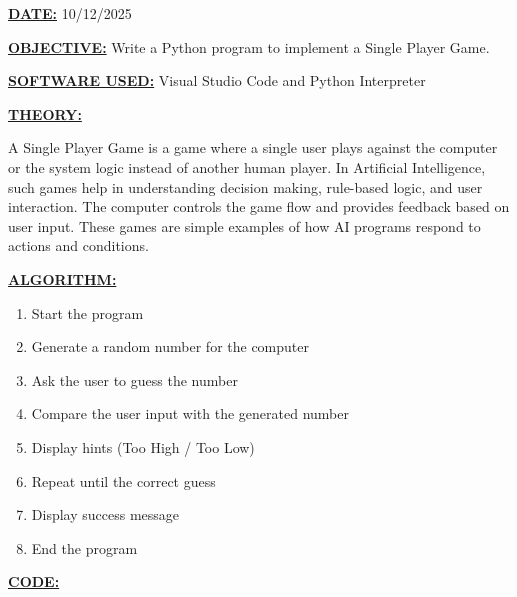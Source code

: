 \documentclass[12pt,a4paper]{article}
\begin{document}
\textbf{\underline{DATE:}} 10/12/2025

\vspace{0.5cm}
\textbf{\underline{OBJECTIVE:}} Write a Python program to implement a Single Player Game.

\vspace{0.5cm}
\textbf{\underline{SOFTWARE USED:}} Visual Studio Code and Python Interpreter

\vspace{0.5cm}
\textbf{\underline{THEORY:}}

A Single Player Game is a game where a single user plays against the computer or the system logic instead of another human player. In Artificial Intelligence, such games help in understanding decision making, rule-based logic, and user interaction. The computer controls the game flow and provides feedback based on user input. These games are simple examples of how AI programs respond to actions and conditions.

\vspace{0.5cm}
\textbf{\underline{ALGORITHM:}}
\begin{enumerate}
  \item Start the program
  \item Generate a random number for the computer
  \item Ask the user to guess the number
  \item Compare the user input with the generated number
  \item Display hints (Too High / Too Low)
  \item Repeat until the correct guess
  \item Display success message
  \item End the program
\end{enumerate}

\vspace{0.5cm}
\textbf{\underline{CODE:}}
\end{document}
